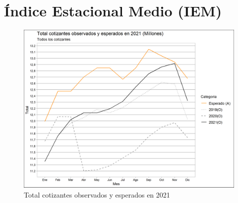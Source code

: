 \section{Índice Estacional Medio (IEM)}


\begin{figure}
\label{fig:Cap22:Novedad_1}%
\includegraphics[width = 12.5cm]{figures/Capitulo_2_1/grafico_tot_1_1_1.png}
\caption{Total cotizantes observados y esperados en 2021}
\label{figura:IEM_Total}
\end{figure}
\lipsum[2-3]

\begin{intemize}
\item 
\end{intemize}